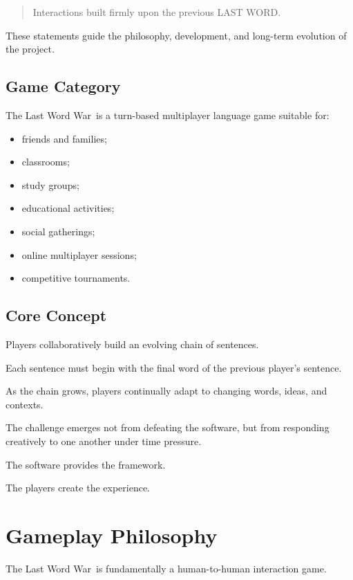 \documentclass[11pt,a4paper]{article}
\begin{document}
\begin{quote}
Interactions built firmly upon the previous LAST WORD.
\end{quote}

These statements guide the philosophy, development, and long-term evolution of the project.

\subsection{Game Category}

The Last Word War\texttrademark\ is a turn-based multiplayer language game suitable for:

\begin{itemize}
    \item friends and families;
    \item classrooms;
    \item study groups;
    \item educational activities;
    \item social gatherings;
    \item online multiplayer sessions;
    \item competitive tournaments.
\end{itemize}

\subsection{Core Concept}

Players collaboratively build an evolving chain of sentences.

Each sentence must begin with the final word of the previous player's sentence.

As the chain grows, players continually adapt to changing words, ideas, and contexts.

The challenge emerges not from defeating the software, but from responding creatively to one another under time pressure.

The software provides the framework.

The players create the experience.

\section{Gameplay Philosophy}

The Last Word War\texttrademark\ is fundamentally a human-to-human interaction game.
\end{document}
